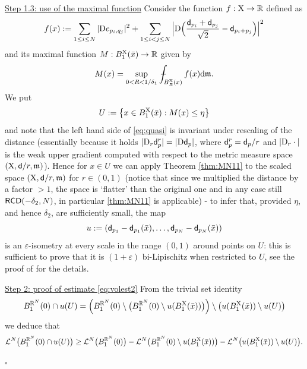 \documentclass[reqno,11pt]{article}
\numberwithin{equation}{section}
\newcommand{\R}{\mathbb{R}}
\newcommand{\mm}{{\mbox{\boldmath$m$}}}
\newcommand{\sfd}{{\sf d}}
\renewcommand{\d}{{\mathrm d}}
\newcommand{\eps}{\varepsilon}
\newcommand{\mean}[1]{\,-\hskip-1.08em\int_{#1}} %
\renewcommand{\mm}{\mathfrak m}                                %
\renewenvironment{proof}{\removelastskip\par\medskip   %
\noindent{\em Proof} \rm}{\penalty-20\null\hfill$\square$\par\medbreak}
\newcommand{\X}{{\rm X}}
\newcommand{\RCD}{{\sf RCD}}
\newcommand{\D}{{\rm D}}
\begin{document}
\begin{proof}
    \underline{Step 1.3: use of the maximal function} Consider the function $f:\X\to\R$ defined as
\begin{equation}\label{eq:ff}
f(x):=\sum_{1\le i\le N}| \D e_{p_i,q_j} |^2+\sum_{1\le i<j\le N}\Big| \D\Big(\frac{\sfd_{p_i}+\sfd_{p_j}}{\sqrt 2}-\sfd_{p_i+p_j}\Big)\Big|^2
\end{equation}
and its maximal function $M: B_1^\X(\bar x)\to\R$ given by
\[
M(x)=\sup_{0<R<1/\delta_1} \mean{B_R^\X(x)} f(x)\d\mm.
\]
We put
\[
U:=\big\{x\in B_1^\X(\bar x):  M(x)\le \eta\big\}
\]
and note  that  the left hand side of \eqref{eq:quasi} is invariant under rescaling of the distance (essentially because  it holds \(|\D_r \sfd_p^r|=|\D\sfd_p|\), where  \(\sfd^r_p=\sfd_p/r \) and \(|\D_r\cdot|\) is the weak upper gradient computed with respect to the metric measure space \((\X,\sfd/r,\mm)\)).  Hence for  \(x\in U\) we can apply Theorem \ref{thm:MN11} { to the scaled space $(\X,\sfd/r,\mm)$ for $r\in(0,1)$ (notice that since we multiplied the distance by a factor $>1$, the space is `flatter' than the original one and in any case still  $\RCD(-\delta_2,N)$, in particular \ref{thm:MN11} is applicable) -} to infer that, provided \(\eta\), and hence \(\delta_2\),  are sufficiently small,  the map
\[
u:=(\sfd_{p_1}-\sfd_{p_1}(\bar x ),\dots, \sfd_{p_N}-\sfd_{p_N}(\bar x))
\]
is an $\eps$-isometry at every scale { in the range $(0,1)$} around points on $U$: this is sufficient to prove that it is \((1+\eps)\) bi-Lipischitz  when restricted to \(U\), see the proof of  \cite[Theorem 6.8]{Mondino-Naber14}  for the  details. 




\medskip
\noindent
 \underline{Step 2: proof of estimate \eqref{eq:volest2}} From the trivial set identity
\[
B_1^{\R^N}(0)\cap u(U)=\Big(B_1^{\R^N}(0)\setminus\big(B_1^{\R^N}(0)\setminus u(B_1^\X(\bar x))\big)\Big)\setminus\big(u(B_1^\X(\bar x))\setminus u(U)\big)
\]
we deduce that
\begin{equation}
\label{eq:pezzi}
\mathcal L^N\big(B_1^{\R^N}(0)\cap u(U)\big)\geq \mathcal L^N\big(B_1^{\R^N}(0)\big)-\mathcal L^N\big(B_1^{\R^N}(0)\setminus u(B_1^\X(\bar x))\big)-\mathcal L^N\big(u(B_1^\X(\bar x))\setminus u(U)\big).
\end{equation}


\end{proof}
\end{document}
